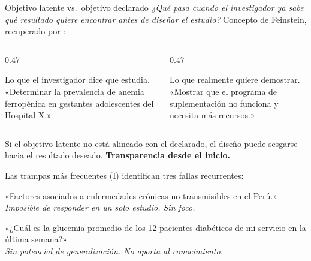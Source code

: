\documentclass[12pt, aspectratio=169]{beamer}
\begin{document}

\begin{frame}{Objetivo latente vs.\ objetivo declarado}
  \textit{¿Qué pasa cuando el investigador ya sabe qué resultado quiere
  encontrar antes de diseñar el estudio?}
  Concepto de Feinstein, recuperado por \textcite{Vandenbroucke2018_ideas}:

  \smallskip
  \begin{columns}[T]
    \begin{column}{0.47\textwidth}
      \begin{definitionbox}
        \small
        Lo que el investigador dice que estudia.\\[4pt]
        «Determinar la prevalencia de anemia
        ferropénica en gestantes adolescentes
        del Hospital X.»
      \end{definitionbox}
    \end{column}
    \begin{column}{0.47\textwidth}
      \begin{definitionbox}
        \small
        Lo que realmente quiere demostrar.\\[4pt]
        «Mostrar que el programa de
        suplementación no funciona
        y necesita más recursos.»
      \end{definitionbox}
    \end{column}
  \end{columns}

  \smallskip
  \begin{warningbox}[Riesgo]
    \small
    Si el objetivo latente no está alineado con el declarado,
    el diseño puede sesgarse hacia el resultado deseado.
    \textbf{Transparencia desde el inicio.}
  \end{warningbox}
\end{frame}

\begin{frame}{Las trampas más frecuentes (I)}
  \textcite{Covvey2024_basics} identifican tres fallas recurrentes:

  \medskip
  \begin{warningbox}
    \small
    «Factores asociados a enfermedades crónicas no transmisibles en el Perú.»\\
    \textit{Imposible de responder en un solo estudio. Sin foco.}
  \end{warningbox}

  \medskip
  \begin{warningbox}
    \small
    «¿Cuál es la glucemia promedio de los 12 pacientes diabéticos de mi servicio
    en la última semana?»\\
    \textit{Sin potencial de generalización. No aporta al conocimiento.}
  \end{warningbox}
\end{frame}
\end{document}
